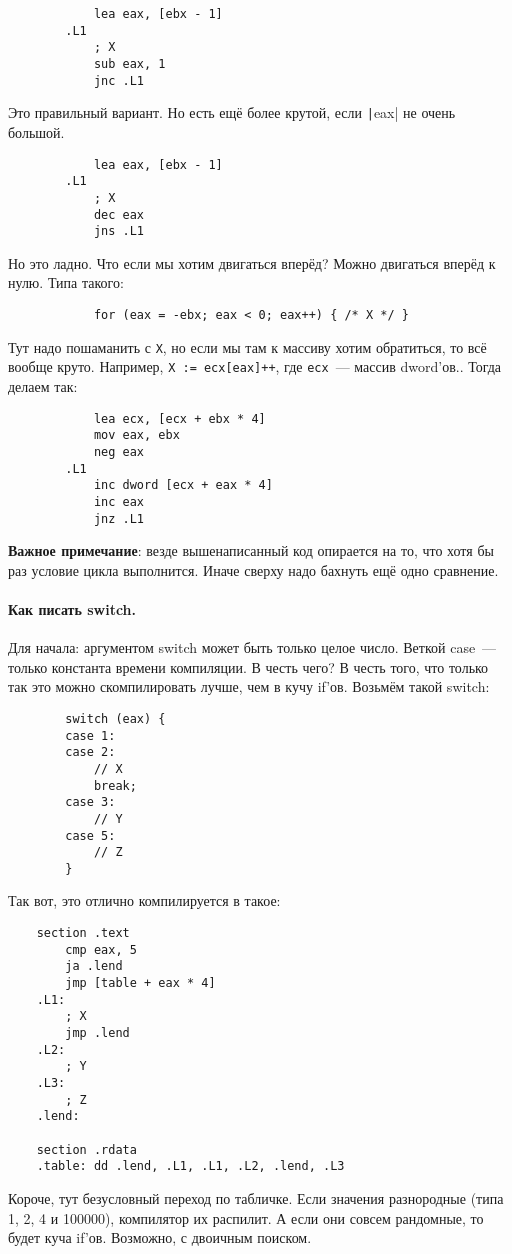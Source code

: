 \documentclass{article}
\begin{document}
\begin{itemize}
        \begin{verbatim}
            lea eax, [ebx - 1]
        .L1
            ; X
            sub eax, 1
            jnc .L1
        \end{verbatim}
        Это правильный вариант. Но есть ещё более крутой, если \texttt|eax| не очень большой.
        \begin{verbatim}
            lea eax, [ebx - 1]
        .L1
            ; X
            dec eax
            jns .L1
        \end{verbatim}
        Но это ладно. Что если мы хотим двигаться вперёд? Можно двигаться вперёд к нулю. Типа такого:
        \begin{verbatim}
            for (eax = -ebx; eax < 0; eax++) { /* X */ }
        \end{verbatim}
        Тут надо пошаманить с \Verb|X|, но если мы там к массиву хотим обратиться, то всё вообще круто. Например, \Verb|X := ecx[eax]++|, где \Verb|ecx|~--- массив dword'ов.. Тогда делаем так:
        \begin{verbatim}
            lea ecx, [ecx + ebx * 4]
            mov eax, ebx
            neg eax
        .L1
            inc dword [ecx + eax * 4]
            inc eax
            jnz .L1
        \end{verbatim}
        \textbf{Важное примечание}: везде вышенаписанный код опирается на то, что хотя бы раз условие цикла выполнится. Иначе сверху надо бахнуть ещё одно сравнение.
    \end{itemize}
    \paragraph{Как писать switch.}
    Для начала: аргументом switch может быть только целое число. Веткой case~--- только константа времени компиляции. В честь чего? В честь того, что только так это можно скомпилировать лучше, чем в кучу if'ов. Возьмём такой switch:
    \begin{verbatim}
        switch (eax) {
        case 1:
        case 2:
            // X
            break;
        case 3:
            // Y
        case 5:
            // Z
        }
    \end{verbatim}
    Так вот, это отлично компилируется в такое:
    \begin{verbatim}
    section .text
        cmp eax, 5
        ja .lend
        jmp [table + eax * 4]
    .L1:
        ; X
        jmp .lend
    .L2:
        ; Y
    .L3:
        ; Z
    .lend:

    section .rdata
    .table: dd .lend, .L1, .L1, .L2, .lend, .L3
    \end{verbatim}
    Короче, тут безусловный переход по табличке. Если значения разнородные (типа 1, 2, 4 и 100000), компилятор их распилит. А если они совсем рандомные, то будет куча if'ов. Возможно, с двоичным поиском.
\end{document}
